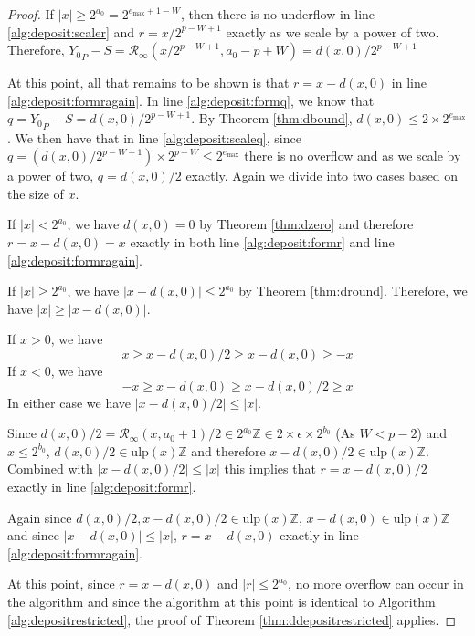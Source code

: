 \documentclass[12pt]{article}
\providecommand{\Z}{\ensuremath{\mathbb{Z}}}
\providecommand{\max}{\ensuremath{\text{max}}}
\providecommand{\ulp}{\ensuremath{\text{ulp}}}
\providecommand{\roundtonearestinfty}{\ensuremath{\mathcal{R}_\text{$\infty$}}}
\theoremstyle{definition}
\numberwithin{equation}{section}
\begin{document}
\begin{proof}
        If $|x| \geq 2^{a_0}= 2^{e_{\max} + 1 - W}$, then there is no underflow in line \ref{alg:deposit:scaler} and $r = x / 2^{p - W + 1}$ exactly as we scale by a power of two. Therefore, ${Y_0}_P - S = \roundtonearestinfty(x/2^{p - W + 1}, a_0 - p + W) = d(x, 0)/2^{p - W + 1}$

        At this point, all that remains to be shown is that $r = x - d(x, 0)$ in line \ref{alg:deposit:formragain}. In line \ref{alg:deposit:formq}, we know that $q = {Y_0}_P - S = d(x, 0)/2^{p - W + 1}$. By Theorem \ref{thm:dbound}, $d(x, 0) \leq 2 \times 2^{e_{\max}}$. We then have that in line \ref{alg:deposit:scaleq}, since $q = (d(x, 0)/2^{p - W + 1})\times2^{p - W} \leq 2^{e_{\max}}$ there is no overflow and as we scale by a power of two, $q = d(x, 0)/2$ exactly. Again we divide into two cases based on the size of $x$.

        If $|x| < 2^{a_0}$, we have $d(x, 0) = 0$ by Theorem \ref{thm:dzero} and therefore $r = x - d(x, 0) = x$ exactly in both line \ref{alg:deposit:formr} and line \ref{alg:deposit:formragain}.

        If $|x| \geq 2^{a_0}$, we have $|x - d(x, 0)| \leq 2^{a_0}$ by Theorem \ref{thm:dround}. Therefore, we have $|x| \geq |x - d(x, 0)|$. 

        If $x > 0$, we have
        \begin{equation*}
          x \geq x - d(x, 0)/2 \geq x - d(x, 0) \geq -x
        \end{equation*}
         If $x < 0$, we have
        \begin{equation*}
          -x \geq x - d(x, 0) \geq x - d(x, 0)/2 \geq x
        \end{equation*}
        In either case we have $|x - d(x, 0)/2| \leq |x|$.

        Since $d(x, 0)/2 = \roundtonearestinfty(x, a_0 + 1)/2 \in 2^{a_0}\Z \in 2 \times \epsilon \times 2^{b_0}$ (As $W < p - 2$) and $x \leq 2^{b_0}$, $d(x, 0)/2 \in \ulp(x)\Z$ and therefore $x - d(x, 0)/2 \in \ulp(x)\Z$. Combined with $|x - d(x, 0)/2| \leq |x|$ this implies that $r = x - d(x, 0)/2$ exactly in line \ref{alg:deposit:formr}.

        Again since $d(x, 0)/2, x - d(x, 0)/2 \in \ulp(x)\Z$, $x - d(x, 0) \in \ulp(x)\Z$ and since $|x - d(x, 0)| \leq |x|$, $r = x - d(x, 0)$ exactly in line \ref{alg:deposit:formragain}.

        At this point, since $r = x - d(x, 0)$ and $|r| \leq 2^{a_0}$, no more overflow can occur in the algorithm and since the algorithm at this point is identical to Algorithm \ref{alg:depositrestricted}, the proof of Theorem \ref{thm:ddepositrestricted} applies.
      \end{proof}
\end{document}
